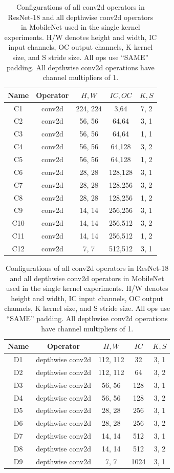 \documentclass[letterpaper,twocolumn,10pt]{article}
\newcommand{\precap}{\vskip -0mm}
\newcommand{\postcap}{\vskip -0mm}
\newcommand{\capsize}[1]{#1}
\begin{document}
\begin{table}[t]
  \begin{footnotesize}
	\begin{tabular}{ccccc}
	\hline
	Name & Operator & $H, W$ & $IC, OC$ & $K, S$ \\
	\hline
	C1  & conv2d & 224, 224 & 3,64  & 7, 2 \\
	C2  & conv2d & 56, 56 & 64,64   & 3, 1 \\
	C3  & conv2d & 56, 56 & 64,64   & 1, 1 \\
	C4  & conv2d & 56, 56 & 64,128  & 3, 2 \\
	C5  & conv2d & 56, 56 & 64,128  & 1, 2 \\
	C6  & conv2d & 28, 28 & 128,128 & 3, 1 \\
	C7  & conv2d & 28, 28 & 128,256 & 3, 2 \\
	C8  & conv2d & 28, 28 & 128,256 & 1, 2 \\
	C9  & conv2d & 14, 14 & 256,256 & 3, 1 \\
	C10 & conv2d & 14, 14 & 256,512 & 3, 2 \\
	C11 & conv2d & 14, 14 & 256,512 & 1, 2 \\
	C12 & conv2d &  7,  7 & 512,512 & 3, 1 \\
	\hline
	\end{tabular}
	\begin{tabular}{ccccc}
		\hline
		Name & Operator & $H, W$ & $IC$ & $K, S$ \\
		\hline
		D1  & depthwise conv2d & 112, 112 & 32 & 3, 1 \\
		D2  & depthwise conv2d & 112, 112 & 64 & 3, 2 \\
		D3  & depthwise conv2d & 56, 56 & 128 & 3, 1 \\
		D4  & depthwise conv2d & 56, 56 & 128 & 3, 2 \\
		D5  & depthwise conv2d & 28, 28 & 256 & 3, 1 \\
		D6  & depthwise conv2d & 28, 28 & 256 & 3, 2 \\
		D7  & depthwise conv2d & 14, 14 & 512 & 3, 1 \\
		D8  & depthwise conv2d & 14, 14 & 512 & 3, 2 \\
		D9  & depthwise conv2d &  7,  7 & 1024& 3, 1 \\
		\hline
	\end{tabular}
  \end{footnotesize}
	\centering
	\precap
	\caption{\capsize{Configurations of all conv2d operators in ResNet-18 and all depthwise conv2d operators in MobileNet used in the single kernel experiments.
	H/W denotes height and width, IC input channels, OC output channels,
	K kernel size, and S stride size. All ops use ``SAME'' padding. All depthwise conv2d operations have channel multipliers of 1.}}
	\postcap
	\label{tbl:all-op}
\end{table}
\end{document}
